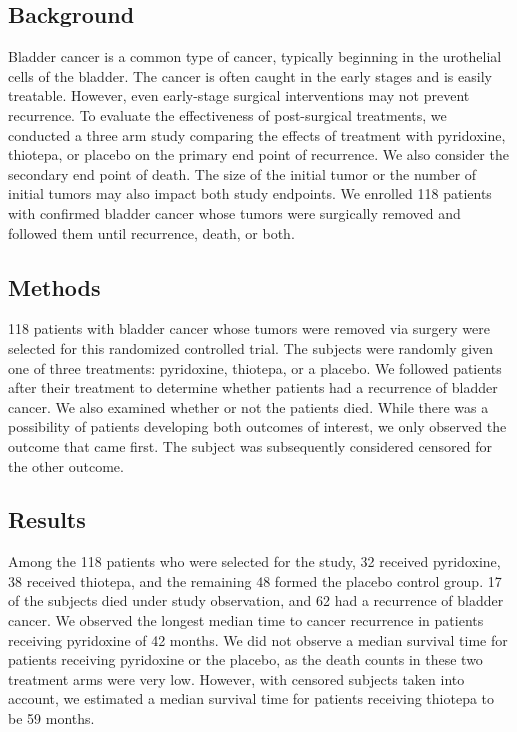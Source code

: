 \documentclass{article}
\begin{document}
	\newpage
	\subsection*{Background} %

	Bladder cancer is a common type of cancer, typically beginning in the urothelial cells of the bladder. The cancer is often caught in the early stages and is easily treatable. However, even early-stage surgical interventions may not prevent recurrence. To evaluate the effectiveness of post-surgical treatments, we conducted a three arm study comparing the effects of treatment with pyridoxine, thiotepa, or placebo on the primary end point of recurrence. We also consider the secondary end point of death. The size of the initial tumor or the number of initial tumors may also impact both study endpoints. We enrolled 118 patients with confirmed bladder cancer whose tumors were surgically removed and followed them until recurrence, death, or both.


	\subsection*{Methods}
	118 patients with bladder cancer whose tumors were removed via surgery were selected for this randomized controlled trial. The subjects were randomly given one of three treatments: pyridoxine, thiotepa, or a placebo. We followed patients after their treatment to determine whether patients had a recurrence of bladder cancer. We also examined whether or not the patients died. While there was a possibility of patients developing both outcomes of interest, we only observed the outcome that came first. The subject was subsequently considered censored for the other outcome.

	\subsection*{Results}
	Among the 118 patients who were selected for the study, 32 received pyridoxine, 38 received thiotepa, and the remaining 48 formed the placebo control group. 17 of the subjects died under study observation, and 62 had a recurrence of bladder cancer. We observed the longest median time to cancer recurrence in patients receiving pyridoxine of 42 months. We did not observe a median survival time for patients receiving pyridoxine or the placebo, as the death counts in these two treatment arms were very low. However, with censored subjects taken into account, we estimated a median survival time for patients receiving thiotepa to be 59 months.
\end{document}

